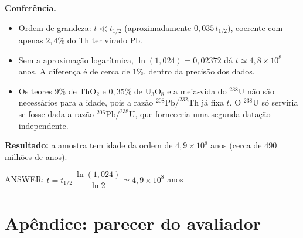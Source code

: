\documentclass{article}%
\begin{document}
\textbf{Conferência.}
\begin{itemize}
\item Ordem de grandeza: $t\ll t_{1/2}$ (aproximadamente $0{,}035\,t_{1/2}$), coerente com apenas $2{,}4\%$ do Th ter virado Pb.
\item Sem a aproximação logarítmica, $\ln(1{,}024)=0{,}02372$ dá $t\simeq 4{,}8\times10^{8}$ anos. A diferença é de cerca de $1\%$, dentro da precisão dos dados.
\item Os teores $9\%$ de $\mathrm{ThO_2}$ e $0{,}35\%$ de $\mathrm{U_3O_8}$ e a meia-vida do $^{238}$U não são necessários para a idade, pois a razão $^{208}\mathrm{Pb}/^{232}\mathrm{Th}$ já fixa $t$. O $^{238}$U só serviria se fosse dada a razão $^{206}\mathrm{Pb}/^{238}\mathrm{U}$, que forneceria uma segunda datação independente.
\end{itemize}

\textbf{Resultado:} a amostra tem idade da ordem de $4{,}9\times10^{8}$ anos (cerca de $490$ milhões de anos).

ANSWER: $t=t_{1/2}\,\dfrac{\ln(1{,}024)}{\ln 2}\simeq 4{,}9\times10^{8}$ anos%
\newpage%
\section*{Apêndice: parecer do avaliador}%
\end{document}
